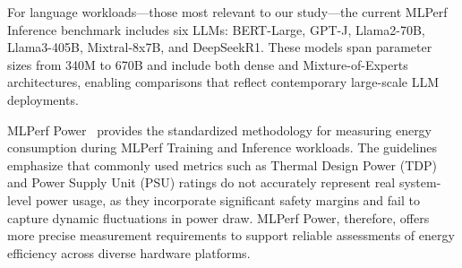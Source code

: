 For language workloads—those most relevant to our study—the current MLPerf Inference benchmark includes six LLMs: BERT-Large, GPT-J, Llama2-70B, Llama3-405B, Mixtral-8x7B, and DeepSeekR1. These models span parameter sizes from 340M to 670B and include both dense and Mixture-of-Experts architectures, enabling comparisons that reflect contemporary large-scale LLM deployments.

MLPerf Power~\cite{Tschand2024} provides the standardized methodology for measuring energy consumption during MLPerf Training and Inference workloads. The guidelines emphasize that commonly used metrics such as Thermal Design Power (TDP) and Power Supply Unit (PSU) ratings do not accurately represent real system-level power usage, as they incorporate significant safety margins and fail to capture dynamic fluctuations in power draw. MLPerf Power, therefore, offers more precise measurement requirements to support reliable assessments of energy efficiency across diverse hardware platforms.